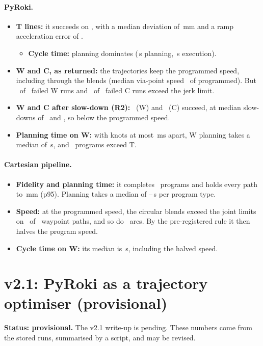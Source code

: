 \documentclass[11pt]{article}
\begin{document}
\paragraph{PyRoki.}
\begin{itemize}
  \item \textbf{T lines:} it succeeds on \ttPySuccT, with a median deviation of \ttPyDevT\,mm and a ramp acceleration error of \ttPyRampT.
  \begin{itemize}
    \item \textbf{Cycle time:} planning dominates (\ttPyReadyT\,s planning, \ttPyExecT\,s execution).
  \end{itemize}
  \item \textbf{W and C, as returned:} the trajectories keep the programmed speed, including through the blends (median via-point speed \ttPyBlendW\ of programmed). But \ttPyJerkW\ of \ttPyFailW\ failed W runs and \ttPyJerkC\ of \ttPyFailC\ failed C runs exceed the jerk limit.
  \item \textbf{W and C after slow-down (R2):} \ttPyRTwoW\ (W) and \ttPyRTwoC\ (C) succeed, at median slow-downs of \ttPyScaleW\ and \ttPyScaleC, so below the programmed speed.
  \item \textbf{Planning time on W:} with knots at most \ttKnotDt\,ms apart, W planning takes a median of \ttPyReadyW\,s, and \ttPyOverW\ programs exceed T.
\end{itemize}

\paragraph{Cartesian pipeline.}
\begin{itemize}
  \item \textbf{Fidelity and planning time:} it completes \ttCartSuccAll\ programs and holds every path to \ttCartDevPNinetyFive\,mm (p95). Planning takes a median of \ttCartReadyMin--\ttCartReadyMax\,s per program type.
  \item \textbf{Speed:} at the programmed speed, the circular blends exceed the joint limits on \ttCartHalvedW\ of \ttCells\ waypoint paths, and so do \ttCartHalvedC\ arcs. By the pre-registered rule it then halves the program speed.
  \item \textbf{Cycle time on W:} its median is \ttCartCycleW\,s, including the halved speed.
\end{itemize}

\section{v2.1: PyRoki as a trajectory optimiser (provisional)}
\label{sec:pyroki}
\noindent\textbf{Status: provisional.} The v2.1 write-up is pending. These numbers come from the stored runs, summarised by a script, and may be revised.
\end{document}

